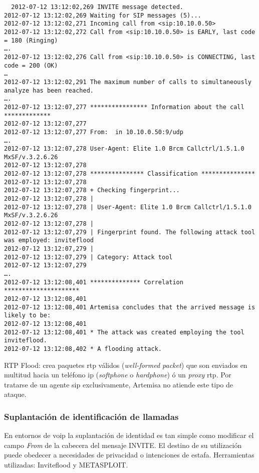 \documentclass[a4paper,12pt]{report}
\newenvironment{myscriptlisting}
{\begin{list}{}{\setlength{\leftmargin}{1em}}\item\scriptsize\bfseries}
{\end{list}}
\begin{document}
\begin{myscriptlisting}
 \begin{verbatim}
  2012-07-12 13:12:02,269 INVITE message detected.
2012-07-12 13:12:02,269 Waiting for SIP messages (5)...
2012-07-12 13:12:02,271 Incoming call from <sip:10.10.0.50>
2012-07-12 13:12:02,272 Call from <sip:10.10.0.50> is EARLY, last code = 180 (Ringing)
….
2012-07-12 13:12:02,276 Call from <sip:10.10.0.50> is CONNECTING, last code = 200 (OK)
…
2012-07-12 13:12:02,291 The maximum number of calls to simultaneously analyze has been reached.
….
2012-07-12 13:12:07,277 **************** Information about the call *************
2012-07-12 13:12:07,277 
2012-07-12 13:12:07,277 From:  in 10.10.0.50:9/udp
….
2012-07-12 13:12:07,278 User-Agent: Elite 1.0 Brcm Callctrl/1.5.1.0 MxSF/v.3.2.6.26
2012-07-12 13:12:07,278 
2012-07-12 13:12:07,278 *************** Classification ***************
2012-07-12 13:12:07,278 
2012-07-12 13:12:07,278 + Checking fingerprint...
2012-07-12 13:12:07,278 |
2012-07-12 13:12:07,278 | User-Agent: Elite 1.0 Brcm Callctrl/1.5.1.0 MxSF/v.3.2.6.26
2012-07-12 13:12:07,278 |
2012-07-12 13:12:07,279 | Fingerprint found. The following attack tool was employed: inviteflood
2012-07-12 13:12:07,279 |
2012-07-12 13:12:07,279 | Category: Attack tool
2012-07-12 13:12:07,279 
….
2012-07-12 13:12:08,401 ************** Correlation *********************
2012-07-12 13:12:08,401 
2012-07-12 13:12:08,401 Artemisa concludes that the arrived message is likely to be:
2012-07-12 13:12:08,401 
2012-07-12 13:12:08,401 * The attack was created employing the tool inviteflood.
2012-07-12 13:12:08,402 * A flooding attack.

 \end{verbatim}
\end{myscriptlisting}

RTP Flood: crea paquetes \ac{rtp} válidos (\emph{well-formed packet}) que son enviados en multitud 
hacia un teléfono \ac{ip} (\emph{softphone} o \emph{hardphone}) ó un \emph{proxy} \ac{rtp}. Por tratarse de un
agente \ac{sip} exclusivamente, Artemisa no atiende este tipo de ataque. 

\subsubsection{Suplantación de identificación de llamadas\\}

En entornos de \ac{voip} la suplantación de identidad es tan simple como modificar el
 campo \emph{From} de la cabecera del mensaje INVITE. El destino de su utilización
puede obedecer a necesidades de privacidad o intenciones de estafa. Herramientas
utilizadas: Inviteflood y \mbox{METASPLOIT}.\\
\end{document}
